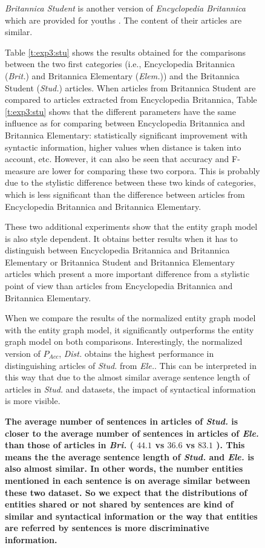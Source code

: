 \begin{figure}[!t]
\textit{Britannica Student} is another version of \textit{Encyclopedia Britannica} which are provided for youths \cite{guinaudeau13}. 
The content of their articles are similar.

Table \ref{t:exp3:stu} shows the results obtained for the comparisons between the two first categories (i.e., Encyclopedia Britannica (\textit{Brit.}) and Britannica Elementary (\textit{Elem.})) and the Britannica Student (\textit{Stud.}) articles. 
When articles from Britannica Student are compared to articles extracted from Encyclopedia Britannica, Table \ref{t:exp3:stu} shows that the different parameters have the same influence as for comparing between Encyclopedia Britannica and Britannica
Elementary: statistically significant improvement with syntactic information, higher values when distance is taken into account, etc.
However, it can also be seen that accuracy and F-measure are lower for comparing these two corpora. 
This is probably due to the stylistic difference between these two kinds of categories, which is less significant than the difference between articles from Encyclopedia Britannica and Britannica Elementary.

These two additional experiments show that the entity graph model is also style dependent. 
It obtains better results when it has to distinguish between Encyclopedia Britannica and Britannica Elementary or Britannica Student and Britannica Elementary articles which present a more important difference from
a stylistic point of view than articles from Encyclopedia Britannica and Britannica Elementary.

When we compare the results of the normalized entity graph model with the entity graph model, it significantly outperforms the entity graph model on both comparisons. 
Interestingly, the normalized version of $P_{Acc}$, \textit{Dist.} obtains the highest performance in distinguishing articles of \textit{Stud.} from \textit{Ele.}. 
This can be interpreted in this way that due to the almost similar average sentence length of articles in \textit{Stud.} and  datasets, the impact of syntactical information is more visible. 

\textbf{
The average number of sentences in articles of \textit{Stud.} is closer to the average number of sentences in articles of \textit{Ele.} than those of articles in \textit{Bri.} 
( $44.1$ vs $36.6$ vs $83.1$ ). 
This means the the average sentence length of \textit{Stud.} and \textit{Ele.} is also almost similar. 
In other words, the number entities mentioned in each sentence is on average similar between these two dataset. 
So we expect that the distributions of entities shared or not shared by sentences are kind of similar and syntactical information or the way that entities are referred by sentences is more discriminative information. 
}



\end{figure}
